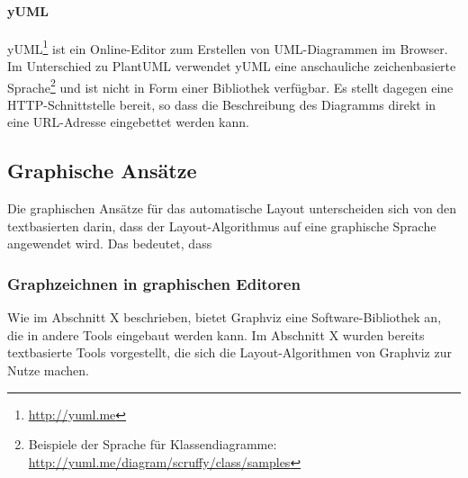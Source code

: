 \paragraph{yUML}

yUML\footnote{\url{http://yuml.me}} ist ein Online-Editor zum Erstellen von UML-Diagrammen im Browser. Im Unterschied zu PlantUML verwendet yUML eine anschauliche zeichenbasierte Sprache\footnote{Beispiele der Sprache für Klassendiagramme: \url{http://yuml.me/diagram/scruffy/class/samples}} und ist nicht in Form einer Bibliothek verfügbar. Es stellt dagegen eine HTTP-Schnittstelle bereit, so dass die Beschreibung des Diagramms direkt in eine URL-Adresse eingebettet werden kann.

\subsection{Graphische Ansätze}
\label{subsec:automatic-layout-graphical-approaches}


Die graphischen Ansätze für das automatische Layout unterscheiden sich von den textbasierten darin, dass der Layout-Algorithmus auf eine graphische Sprache angewendet wird. Das bedeutet, dass 




\subsubsection{Graphzeichnen in graphischen Editoren}

Wie im Abschnitt X beschrieben, bietet Graphviz eine Software-Bibliothek an, die in andere Tools eingebaut werden kann. Im Abschnitt X wurden bereits textbasierte Tools vorgestellt, die sich die Layout-Algorithmen von Graphviz zur Nutze machen. 



